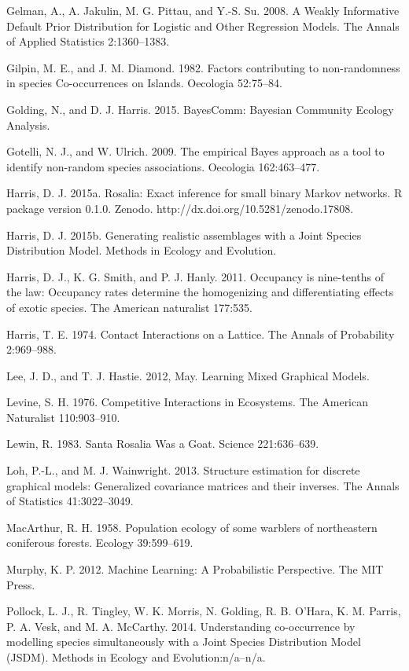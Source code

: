 \documentclass[12pt,]{article}
\begin{document}
\begin{spacing}{1.9}
\begin{flushleft}
Gelman, A., A. Jakulin, M. G. Pittau, and Y.-S. Su. 2008. A Weakly
Informative Default Prior Distribution for Logistic and Other Regression
Models. The Annals of Applied Statistics 2:1360--1383.

Gilpin, M. E., and J. M. Diamond. 1982. Factors contributing to
non-randomness in species Co-occurrences on Islands. Oecologia
52:75--84.

Golding, N., and D. J. Harris. 2015. BayesComm: Bayesian Community
Ecology Analysis.

Gotelli, N. J., and W. Ulrich. 2009. The empirical Bayes approach as a
tool to identify non-random species associations. Oecologia
162:463--477.

Harris, D. J. 2015a. Rosalia: Exact inference for small binary Markov
networks. R package version 0.1.0. Zenodo.
http://dx.doi.org/10.5281/zenodo.17808.

Harris, D. J. 2015b. Generating realistic assemblages with a Joint
Species Distribution Model. Methods in Ecology and Evolution.

Harris, D. J., K. G. Smith, and P. J. Hanly. 2011. Occupancy is
nine-tenths of the law: Occupancy rates determine the homogenizing and
differentiating effects of exotic species. The American naturalist
177:535.

Harris, T. E. 1974. Contact Interactions on a Lattice. The Annals of
Probability 2:969--988.

Lee, J. D., and T. J. Hastie. 2012, May. Learning Mixed Graphical
Models.

Levine, S. H. 1976. Competitive Interactions in Ecosystems. The American
Naturalist 110:903--910.

Lewin, R. 1983. Santa Rosalia Was a Goat. Science 221:636--639.

Loh, P.-L., and M. J. Wainwright. 2013. Structure estimation for
discrete graphical models: Generalized covariance matrices and their
inverses. The Annals of Statistics 41:3022--3049.

MacArthur, R. H. 1958. Population ecology of some warblers of
northeastern coniferous forests. Ecology 39:599--619.

Murphy, K. P. 2012. Machine Learning: A Probabilistic Perspective. The
MIT Press.

Pollock, L. J., R. Tingley, W. K. Morris, N. Golding, R. B. O'Hara, K.
M. Parris, P. A. Vesk, and M. A. McCarthy. 2014. Understanding
co-occurrence by modelling species simultaneously with a Joint Species
Distribution Model (JSDM). Methods in Ecology and Evolution:n/a--n/a.


\end{flushleft}
\end{spacing}
\end{document}
